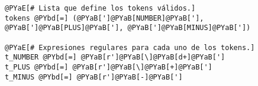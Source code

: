 \begin{Verbatim}[commandchars=@\[\]]
@PYaE[# Lista que define los tokens válidos.]
tokens @PYbd[=] (@PYaB[']@PYaB[NUMBER]@PYaB['], @PYaB[']@PYaB[PLUS]@PYaB['], @PYaB[']@PYaB[MINUS]@PYaB['])

@PYaE[# Expresiones regulares para cada uno de los tokens.]
t_NUMBER @PYbd[=] @PYaB[r']@PYaB[\]@PYaB[d+]@PYaB[']
t_PLUS @PYbd[=] @PYaB[r']@PYaB[\]@PYaB[+]@PYaB[']
t_MINUS @PYbd[=] @PYaB[r']@PYaB[-]@PYaB[']
\end{Verbatim}
